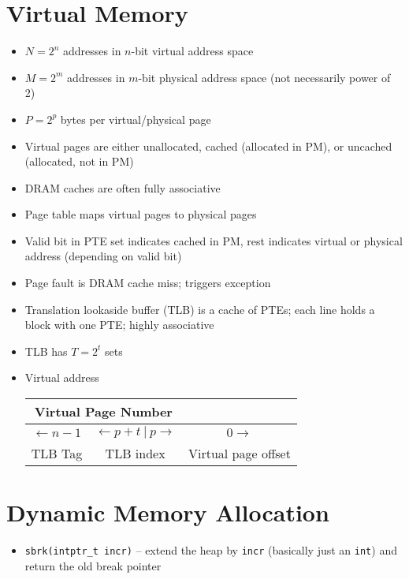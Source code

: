 \documentclass[twocolumn]{article}
\begin{document}
\section{Virtual Memory}
\begin{itemize}[noitemsep]
\item $N = 2^n$ addresses in $n$-bit virtual address space
\item $M = 2^m$ addresses in $m$-bit physical address space (not necessarily power of 2)
\item $P = 2^p$ bytes per virtual/physical page
\item Virtual pages are either unallocated, cached (allocated in PM), or uncached (allocated, not in PM)
\item DRAM caches are often fully associative
\item Page table maps virtual pages to physical pages
\item Valid bit in PTE set indicates cached in PM, rest indicates virtual or physical address (depending on valid bit)
\item Page fault is DRAM cache miss; triggers exception
\item Translation lookaside buffer (TLB) is a cache of PTEs; each line holds a block with one PTE; highly associative
\item TLB has $T = 2^t$ sets
\item Virtual address \\

\begin{tabular}{| c | c | c |}
    \multicolumn{2}{|c|}{Virtual Page Number} & \\ \hline
    $\leftarrow n - 1$ & $\leftarrow p + t \ |\ p \rightarrow$ & $0 \rightarrow$ \\ \hline
    TLB Tag & TLB index & Virtual page offset
\end{tabular}
\end{itemize}

\section{Dynamic Memory Allocation}
\begin{itemize}[noitemsep]
\item \texttt{sbrk(intptr\_t incr)} -- extend the heap by \texttt{incr} (basically just an \texttt{int}) and return the old break pointer
\end{itemize}

\vfill
\end{document}
